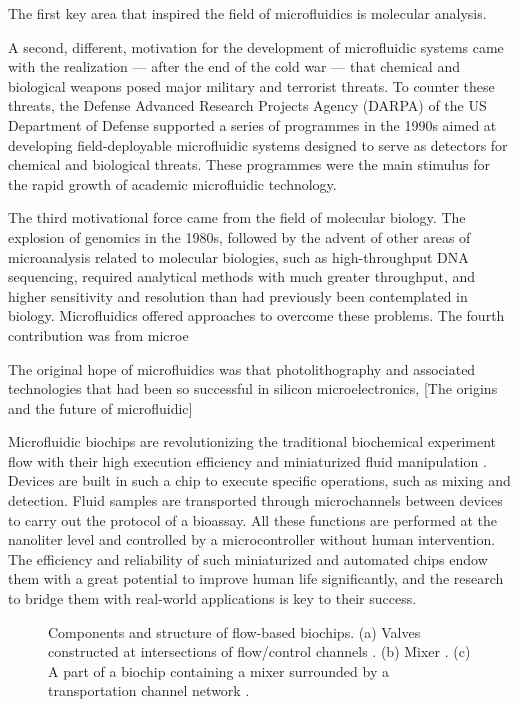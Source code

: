 The first key area that inspired the field of microfluidics is molecular analysis. 

A second, different, motivation for the development of microfluidic systems came with the realization — after the end of the cold war — that chemical and biological weapons posed major military and terrorist threats. To counter these threats, the Defense Advanced Research Projects Agency (DARPA) of the US Department of Defense supported a series of programmes in the 1990s aimed at developing field-deployable microfluidic systems designed to serve as detectors for chemical and biological threats. These programmes were the main stimulus for the rapid growth of academic microfluidic technology.

The third motivational force came from the field of molecular biology. The explosion of genomics in the 1980s, followed by the advent of other areas of microanalysis related to molecular biologies, such as high-throughput DNA sequencing, required analytical methods with much greater throughput, and higher sensitivity and resolution than had previously been contemplated in biology. Microfluidics offered approaches to overcome these problems. The fourth contribution was from microe


The original hope of microfluidics was that photolithography and associated technologies that had been so successful in silicon microelectronics,
[The origins and the future of microfluidic]


Microfluidic biochips are revolutionizing the traditional biochemical experiment 
flow with their high execution efficiency and 
miniaturized fluid manipulation \cite{JEMP08, EVNR03,JMSQ07}. 
Devices are built 
in such a chip to execute specific operations, such as mixing and detection.
Fluid samples are transported through microchannels between devices to carry
out the protocol of a bioassay. 
All these functions are performed at the nanoliter level and
controlled by a microcontroller without human intervention. 
The efficiency and reliability of such miniaturized and automated chips 
endow them with a great potential to improve human life significantly, 
and the research to bridge them with real-world applications
is key to their success.   

\begin{figure}[htpb]
    {      
    \centering
    
    \caption{Components and structure of flow-based biochips. 
    (a) Valves constructed at intersections of flow/control channels \cite{JMSQ07}. 
    (b) Mixer \cite{JMSQ07}. (c) A part of a biochip
    containing a mixer surrounded by a transportation channel network 
    \cite{ESWD13}.}
    \label{fig:valve_mixer_chip}
    }
    \end{figure}

